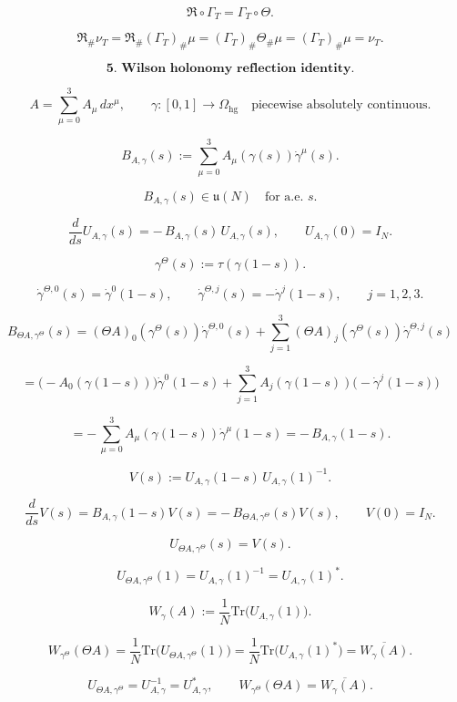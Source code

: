 \documentclass[11pt]{article}
\begin{document}
\[
\mathfrak R\circ\Gamma_T=\Gamma_T\circ\Theta.
\]

\[
\mathfrak R_\#\nu_T
=
\mathfrak R_\#(\Gamma_T)_\#\mu
=
(\Gamma_T)_\#\Theta_\#\mu
=
(\Gamma_T)_\#\mu
=
\nu_T.
\]

\bigskip

\[
\textbf{5. Wilson holonomy reflection identity.}
\]

\[
A=\sum_{\mu=0}^3A_\mu\,dx^\mu,
\qquad
\gamma:[0,1]\to\Omega_{\mathrm{hg}}
\quad
\text{piecewise absolutely continuous}.
\]

\[
B_{A,\gamma}(s)
:=
\sum_{\mu=0}^3A_\mu(\gamma(s))\dot\gamma^\mu(s).
\]

\[
B_{A,\gamma}(s)\in\mathfrak u(N)
\quad
\text{for a.e. }s.
\]

\[
\frac{d}{ds}U_{A,\gamma}(s)
=
-\,B_{A,\gamma}(s)\,U_{A,\gamma}(s),
\qquad
U_{A,\gamma}(0)=I_N.
\]

\[
\gamma^\Theta(s):=\tau(\gamma(1-s)).
\]

\[
\dot\gamma^{\Theta,0}(s)=\dot\gamma^0(1-s),
\qquad
\dot\gamma^{\Theta,j}(s)=-\dot\gamma^j(1-s),
\qquad
j=1,2,3.
\]

\[
B_{\Theta A,\gamma^\Theta}(s)
=
(\Theta A)_0(\gamma^\Theta(s))\dot\gamma^{\Theta,0}(s)
+
\sum_{j=1}^3
(\Theta A)_j(\gamma^\Theta(s))\dot\gamma^{\Theta,j}(s)
\]

\[
=
\bigl(-A_0(\gamma(1-s))\bigr)\dot\gamma^0(1-s)
+
\sum_{j=1}^3
A_j(\gamma(1-s))\bigl(-\dot\gamma^j(1-s)\bigr)
\]

\[
=
-\,\sum_{\mu=0}^3A_\mu(\gamma(1-s))\dot\gamma^\mu(1-s)
=
-\,B_{A,\gamma}(1-s).
\]

\[
V(s):=U_{A,\gamma}(1-s)\,U_{A,\gamma}(1)^{-1}.
\]

\[
\frac{d}{ds}V(s)
=
B_{A,\gamma}(1-s)V(s)
=
-\,B_{\Theta A,\gamma^\Theta}(s)V(s),
\qquad
V(0)=I_N.
\]

\[
U_{\Theta A,\gamma^\Theta}(s)=V(s).
\]

\[
U_{\Theta A,\gamma^\Theta}(1)
=
U_{A,\gamma}(1)^{-1}
=
U_{A,\gamma}(1)^\ast.
\]

\[
W_\gamma(A):=\frac1N\mathrm{Tr}\bigl(U_{A,\gamma}(1)\bigr).
\]

\[
W_{\gamma^\Theta}(\Theta A)
=
\frac1N\mathrm{Tr}\bigl(U_{\Theta A,\gamma^\Theta}(1)\bigr)
=
\frac1N\mathrm{Tr}\bigl(U_{A,\gamma}(1)^\ast\bigr)
=
\overline{W_\gamma(A)}.
\]

\[
U_{\Theta A,\gamma^\Theta}
=
U_{A,\gamma}^{-1}
=
U_{A,\gamma}^\ast,
\qquad
W_{\gamma^\Theta}(\Theta A)=\overline{W_\gamma(A)}.
\]
\end{document}
